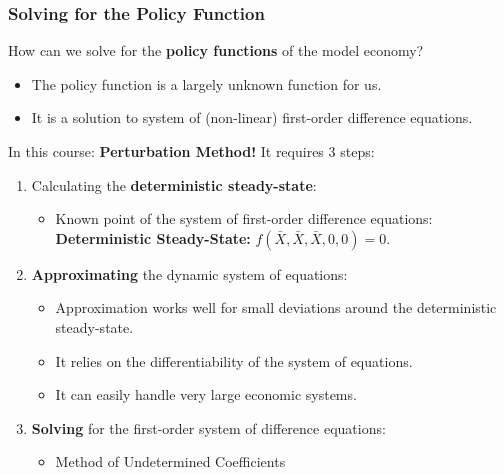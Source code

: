 \documentclass[10pt,c,aspectratio=1610,handout]{beamer}
\begin{document}
\begin{frame}%
  \frametitle{Solving for the Policy Function}%
  How can we solve for the \textbf{policy functions} of the model economy?%
  \begin{itemize}%
    \item[$\blacktriangleright$] The policy function is a largely unknown function for us.%
    \item[$\blacktriangleright$] It is a solution to system of (non-linear) first-order difference equations.%
  \end{itemize}%
  \pause%
  In this course: \textbf{Perturbation Method!} It requires 3 steps:%
  \begin{enumerate}%
    \item Calculating the \textbf{deterministic steady-state}:%
    \begin{footnotesize}%
    \begin{itemize}%
      \item[$\rightarrow$] Known point of the system of first-order difference equations:\\%
      \textbf{Deterministic Steady-State:} $f\left(\bar{X},\bar{X},\bar{X},0,0\right)=0$.%
    \end{itemize}%
    \end{footnotesize}%
    \pause%
    \item \textbf{Approximating} the dynamic system of equations:%
    \begin{footnotesize}%
    \begin{itemize}%
      \item[$\rightarrow$] Approximation works well for small deviations around the deterministic steady-state.%
      \item[$\rightarrow$] It relies on the differentiability of the system of equations.%
      \item[$\rightarrow$] It can easily handle very large economic systems.%
    \end{itemize}%
    \pause%
    \end{footnotesize}%
    \item \textbf{Solving} for the first-order system of difference equations:%
    \begin{footnotesize}%
    \begin{itemize}%
      \item[$\rightarrow$] Method of Undetermined Coefficients%
    \end{itemize}%
    \end{footnotesize}%
  \end{enumerate}%
\end{frame}%
\end{document}

